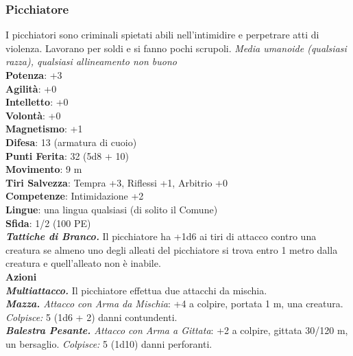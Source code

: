 \begin{multicols}{2}
\subsubsection{Picchiatore}
I picchiatori sono criminali spietati abili nell'intimidire e perpetrare atti di violenza. Lavorano per soldi e si fanno pochi scrupoli.
\emph{Media umanoide (qualsiasi razza), qualsiasi allineamento non buono}\\
\textbf{Potenza}: +3\\
\textbf{Agilità}: +0\\
\textbf{Intelletto}: +0\\
\textbf{Volontà}: +0\\
\textbf{Magnetismo}: +1\\
\textbf{Difesa}: 13 (armatura di cuoio)\\
\textbf{Punti Ferita}: 32 (5d8 + 10)\\
\textbf{Movimento}: 9 m\\
\textbf{Tiri Salvezza}: Tempra +3, Riflessi +1, Arbitrio +0 \\
\textbf{Competenze}: Intimidazione +2\\
\textbf{Lingue}: una lingua qualsiasi (di solito il Comune)\\
\textbf{Sfida}: 1/2 (100 PE)\smallskip\\
\emph{\textbf{Tattiche di Branco.}} Il picchiatore ha +1d6 ai tiri di attacco contro una creatura se almeno uno degli alleati del picchiatore si trova entro 1 metro dalla creatura e quell'alleato non è inabile.\\
\smallskip\textbf{Azioni} \\
\emph{\textbf{Multiattacco.}} Il picchiatore effettua due attacchi da mischia.\\
\emph{\textbf{Mazza.} Attacco con Arma da Mischia}: +4 a colpire, portata 1 m, una creatura.\\
\emph{Colpisce:} 5 (1d6 + 2) danni contundenti.\\
\emph{\textbf{Balestra Pesante.} Attacco con Arma a Gittata}: +2 a colpire, gittata 30/120 m, un bersaglio. \emph{Colpisce:} 5 (1d10) danni perforanti.\\


\end{multicols}
